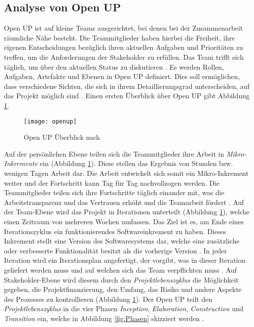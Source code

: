 \subsection{Analyse von Open UP}

Open UP ist auf kleine Teams ausgerichtet, bei denen bei der Zusammenarbeit räumliche Nähe besteht. Die Teammitglieder haben hierbei die Freiheit, ihre eigenen Entscheidungen bezüglich ihren aktuellen Aufgaben und Prioritäten zu treffen, um die Anforderungen der Stakeholder zu erfüllen. Das Team trifft sich täglich, um über den aktuellen Status zu diskutieren \cite{OpenUPProcess}.\newline
Es werden Rollen, Aufgaben, Artefakte und Ebenen in Open UP definiert. Dies soll ermöglichen, dass verschiedene Sichten, die sich in ihrem Detaillierungsgrad unterscheiden, auf das Projekt möglich sind \cite{freudenreichevaluierung}. Einen ersten Überblick über Open UP gibt Abbildung \ref{fig:openup}.

\begin{figure}[htp]
\begin{center}
  \texttt{[image: openup]} %
  \caption{Open UP Überblick nach \cite{eclipseopenup}}
  \label{fig:openup}
\end{center}
\end{figure}

Auf der persönlichen Ebene teilen sich die Teammitglieder ihre Arbeit in \textit{Mikro-Inkremente} ein (Abbildung \ref{fig:openup}). Diese stellen das Ergebnis von Stunden bzw. wenigen Tagen Arbeit dar. Die Arbeit entwickelt sich somit ein Mikro-Inkrement weiter und der Fortschritt kann Tag für Tag nachvollzogen werden. Die Teammitglieder teilen sich ihre Fortschritte täglich einander mit, was die Arbeitstransparenz und das Vertrauen erhöht und die Teamarbeit fördert \cite{eclipseopenup}. \newline
Auf der Team-Ebene wird das Projekt in Iterationen unterteilt (Abbildung \ref{fig:openup}), welche einen Zeitraum von mehreren Wochen umfassen. Das Ziel ist es, am Ende eines Iterationszyklus ein funktionierendes Softwareinkrement zu haben. Dieses Inkrement stellt eine Version des Softwaresystems dar, welche eine zusätzliche oder verbesserte Funktionalität besitzt als die vorherige Version \cite{Basem2010}. In jeder Iteration wird ein Iterationsplan angefertigt, der vorgibt, was in dieser Iteration geliefert werden muss und auf welchen sich das Team verpflichten muss \cite{freudenreichevaluierung}.
Auf Stakeholder-Ebene wird diesem durch den \textit{Projektlebenszyklus} die Möglichkeit gegeben, die Projektfinanzierung, den Umfang, das Risiko und andere Aspekte des Prozesses zu kontrollieren (Abbildung \ref{fig:openup}).
Der Open UP teilt den \textit{Projektlebenszyklus} in die vier Phasen \textit{Inception}, \textit{Elaboration}, \textit{Construction} und \textit{Transition} ein, welche in Abbildung \ref{fig:Phasen} skizziert werden \cite{eclipseopenup}.

